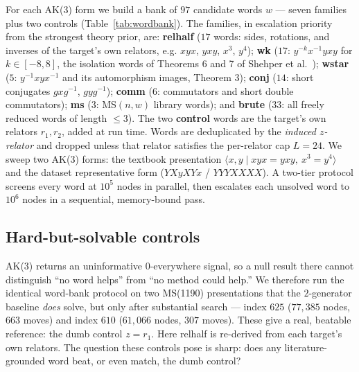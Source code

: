 For each AK(3) form we build a bank of $97$ candidate words $w$ --- seven families plus two
controls (Table~\ref{tab:wordbank}). The families, in escalation priority from the
strongest theory prior, are: \textbf{relhalf} ($17$ words: sides, rotations, and inverses
of the target's own relators, e.g. $xyx$, $yxy$, $x^3$, $y^4$); \textbf{wk} ($17$:
$y^{-k}x^{-1}yxy$ for $k\in[-8,8]$, the isolation words of Theorems 6 and 7 of Shehper et
al.~\cite{shehper2024hard}); \textbf{wstar} ($5$: $y^{-1}xyx^{-1}$ and its automorphism
images, Theorem 3); \textbf{conj} ($14$: short conjugates $gxg^{-1}$, $gyg^{-1}$);
\textbf{comm} ($6$: commutators and short double commutators); \textbf{ms} ($3$:
MS$(n,w)$ library words); and \textbf{brute} ($33$: all freely reduced words of length
$\le 3$). The two \textbf{control} words are the target's own relators $r_1,r_2$, added at
run time. Words are deduplicated by the \emph{induced $z$-relator} and dropped unless that
relator satisfies the per-relator cap $L=24$. We sweep two AK(3) forms: the textbook
presentation $\langle x,y \mid xyx=yxy,\ x^3=y^4\rangle$ and the dataset representative
form ($YXyXYx$ / $YYYXXXX$). A two-tier protocol screens every word at $10^5$ nodes in
parallel, then escalates each unsolved word to $10^6$ nodes in a sequential, memory-bound
pass.

\begin{table}[t]
\centering
\caption{The 97-word literature-grounded bank thrown at stabilized $\mathrm{AK}(3)$: seven
families (95 words) grounded in $\mathrm{AK}(n)$/Miller--Schupp theory or brute
enumeration, plus two per-target control words $z=r_1,r_2$ added at run time.}
\label{tab:wordbank}
\footnotesize
\setlength{\tabcolsep}{4pt}%

\end{table}

\subsection{Hard-but-solvable controls}

AK(3) returns an uninformative $0$-everywhere signal, so a null result there cannot
distinguish ``no word helps'' from ``no method could help.'' We therefore run the identical
word-bank protocol on two MS(1190) presentations that the $2$-generator baseline
\emph{does} solve, but only after substantial search --- index $625$ ($77{,}385$ nodes,
$663$ moves) and index $610$ ($61{,}066$ nodes, $307$ moves). These give a real, beatable
reference: the dumb control $z=r_1$. Here relhalf is re-derived from each target's own
relators. The question these controls pose is sharp: does any literature-grounded word
beat, or even match, the dumb control?

